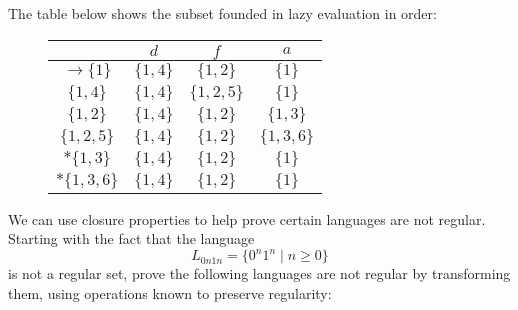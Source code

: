 \documentclass[10pt]{homework}
\begin{document}
\begin{solution}
    The table below shows the subset founded in lazy evaluation in order:
    \begin{figure}[htbp]
        \centering
        \begin{tabular}{c||c|c|c}
             & $d$ & $f$ & $a$ \\\hline\hline
             $\rightarrow \{1\}$ & $\{1,4\}$ & $\{1,2\}$ & $\{1\}$ \\
             $\{1,4\}$ & $\{1,4\}$ & $\{1,2,5\}$ & $\{1\}$ \\
             $\{1,2\}$ & $\{1,4\}$ & $\{1,2\}$ & $\{1,3\}$ \\
             $\{1,2,5\}$ & $\{1,4\}$ & $\{1,2\}$ & $\{1,3,6\}$ \\
             $*\{1,3\}$ & $\{1,4\}$ & $\{1,2\}$ & $\{1\}$ \\
             $*\{1,3,6\}$ & $\{1,4\}$ & $\{1,2\}$ & $\{1\}$
        \end{tabular}
    \end{figure}
\end{solution}

\begin{problem}
  We can use closure properties to help prove certain languages are not regular.
  Starting with the fact that the language
  \begin{equation*}
    L_{0n1n} = \{ 0^{n}1^{n} \mid n \ge 0 \}
  \end{equation*}
  is not a regular set, prove the following languages are not regular by
  transforming them, using operations known to preserve regularity:
\end{problem}

\begin{solution}
\end{solution}
\end{document}
